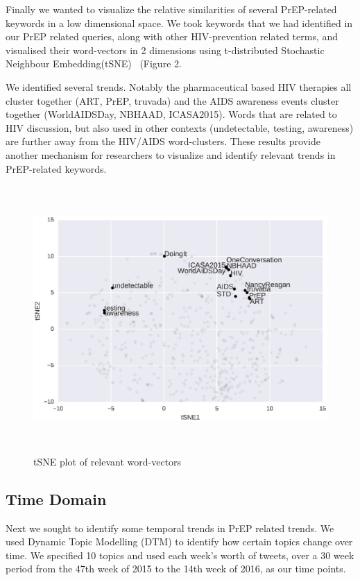 \documentclass{sig-alternate-05-2015}
\begin{document}
Finally we wanted to visualize the relative similarities of several PrEP-related keywords in a low dimensional space. We took keywords that we had identified in our PrEP related queries, along with other HIV-prevention related terms, and visualised their word-vectors in 2 dimensions using t-distributed Stochastic Neighbour Embedding(tSNE)~\cite{van2008visualizing} (Figure 2.

We identified several trends. Notably the pharmaceutical based HIV therapies all cluster together (ART, PrEP, truvada) and the AIDS awareness events cluster together (WorldAIDSDay, NBHAAD, ICASA2015). Words that are related to HIV discussion, but also used in other contexts (undetectable, testing, awareness) are further away from the HIV/AIDS word-clusters. These results provide another mechanism for researchers to visualize and identify relevant trends in PrEP-related keywords.

\begin{figure}
\centering
\includegraphics[height=4in, width=6in]{tSNE_word}
\caption{tSNE plot of relevant word-vectors}
\end{figure}

\subsection{Time Domain}

Next we sought to identify some temporal trends in PrEP related trends. We used Dynamic Topic Modelling (DTM) to identify how certain topics change over time. We specified 10 topics and used each week's worth of tweets, over a 30 week period from the 47th week of 2015 to the 14th week of 2016, as our time points.
\end{document}

